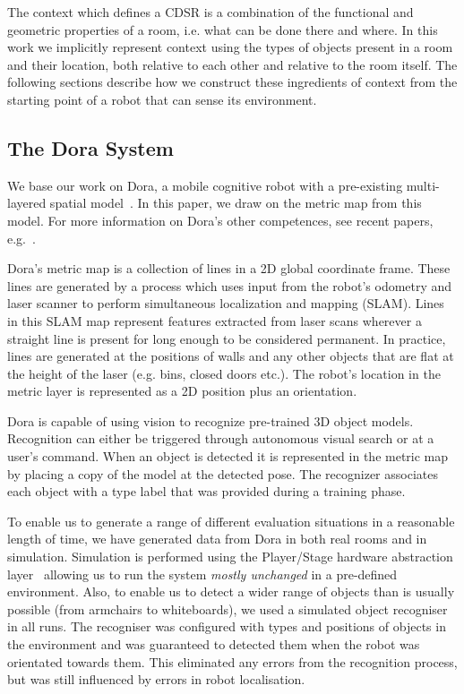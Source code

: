\documentclass[letterpaper]{article}
\begin{document}
The context which defines a CDSR is a combination of the functional and geometric properties of a room, i.e. what can be done there and where. In this work we implicitly represent context using the types of objects present in a room and their location, both relative to each other and relative to the room itself. The following sections describe how we construct these ingredients of context from the starting point of a robot that can sense its environment. 

\subsection{The Dora System}

We base our work on Dora, a mobile cognitive robot with a pre-existing multi-layered spatial model~\cite{Hawes/etal:2011}. In this paper, we draw on the metric map from this model. For more information on Dora's other competences, see recent papers, e.g.~\cite{Hawes/etal:2011,Hanheide/etal:2011}.

Dora's metric map is a collection of lines in a 2D global coordinate frame. These lines are generated by a process which uses input from the robot's odometry and laser scanner to perform simultaneous localization and mapping (SLAM). Lines in this SLAM map represent features extracted from laser scans wherever a straight line is present for long enough to be considered permanent. In practice, lines are generated at the positions of walls and any other objects that are flat at the height of the laser (e.g. bins, closed doors etc.). The robot's location in the metric layer is represented as a 2D position plus an orientation. 

Dora is capable of using vision to recognize pre-trained 3D object models. Recognition can either be triggered through autonomous visual search or at a user's command. When an object is detected it is represented in the metric map 
by placing a copy of the model at the detected pose. The recognizer associates each object with a type label that was provided during a training phase.  

To enable us to generate a range of different evaluation situations in a reasonable length of time, we have generated data from Dora in both real rooms and in simulation. Simulation is performed using the Player/Stage hardware abstraction layer~\cite{GerkeyVaughanHoward03} allowing us to run the system \emph{mostly unchanged} in a pre-defined environment. Also, to enable us to detect a wider range of objects than is usually possible (from armchairs to whiteboards), we used a simulated object recogniser in all runs. The recogniser was configured with types and positions of objects in the environment and was guaranteed to detected them when the robot was orientated towards them. This eliminated any errors from the recognition process, but was still influenced by errors in robot localisation. 
\end{document}
